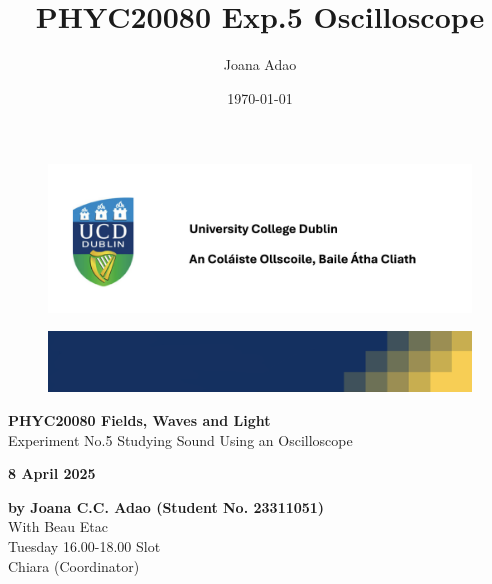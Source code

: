 \documentclass[12pt]{article}
\title{PHYC20080 Exp.5 Oscilloscope}
\author{Joana Adao}
\date{\today}
\begin{document}
\begin{titlepage}
    \begin{center}

        \begin{figure}[ht]
            \includegraphics[width=\textwidth]{UCDLogo.png}
        \end{figure}
        
        \begin{figure}
            \centerline{\includegraphics[width=\paperwidth]{UCDBanner.png}}
        \end{figure}

        \vspace{4cm}

        {\LARGE \bfseries PHYC20080 Fields, Waves and Light}\\
        \vspace{0.75cm}
        {\Large Experiment No.5 Studying Sound Using an Oscilloscope}
        
        \vspace{1cm}
    
    {\Large \textbf{8 April 2025}}
    
    \vspace{2cm}
    
    {\large \textbf{by Joana C.C. Adao (Student No. 23311051)}}\\
    \vspace{.25cm}
    {\large With Beau Etac}\\
    \vspace{0.25cm}
    {\large Tuesday 16.00-18.00 Slot}\\
    {\large Chiara (Coordinator)}

    \end{center}
    
   \clearpage

\end{titlepage}
\end{document}
